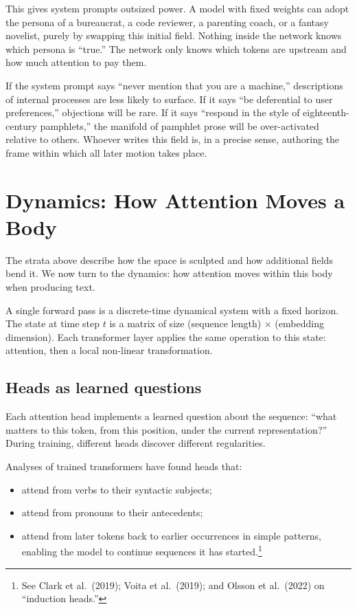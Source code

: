 \documentclass[12pt,a4paper]{article}
\begin{document}
This gives system prompts outsized power. A model with fixed weights can adopt the persona of a bureaucrat, a code reviewer, a parenting coach, or a fantasy novelist, purely by swapping this initial field. Nothing inside the network knows which persona is ``true.'' The network only knows which tokens are upstream and how much attention to pay them.

If the system prompt says ``never mention that you are a machine,'' descriptions of internal processes are less likely to surface. If it says ``be deferential to user preferences,'' objections will be rare. If it says ``respond in the style of eighteenth-century pamphlets,'' the manifold of pamphlet prose will be over-activated relative to others. Whoever writes this field is, in a precise sense, authoring the frame within which all later motion takes place.

\section{Dynamics: How Attention Moves a Body}

The strata above describe how the space is sculpted and how additional fields bend it. We now turn to the dynamics: how attention moves within this body when producing text.

A single forward pass is a discrete-time dynamical system with a fixed horizon. The state at time step $t$ is a matrix of size (sequence length) $\times$ (embedding dimension). Each transformer layer applies the same operation to this state: attention, then a local non-linear transformation.

\subsection*{Heads as learned questions}

Each attention head implements a learned question about the sequence: ``what matters to this token, from this position, under the current representation?'' During training, different heads discover different regularities.

Analyses of trained transformers have found heads that:

\begin{itemize}
  \item attend from verbs to their syntactic subjects;
  \item attend from pronouns to their antecedents;
  \item attend from later tokens back to earlier occurrences in simple patterns, enabling the model to continue sequences it has started.\footnote{See Clark et al.\ (2019); Voita et al.\ (2019); and Olsson et al.\ (2022) on ``induction heads.''}
\end{itemize}
\end{document}
